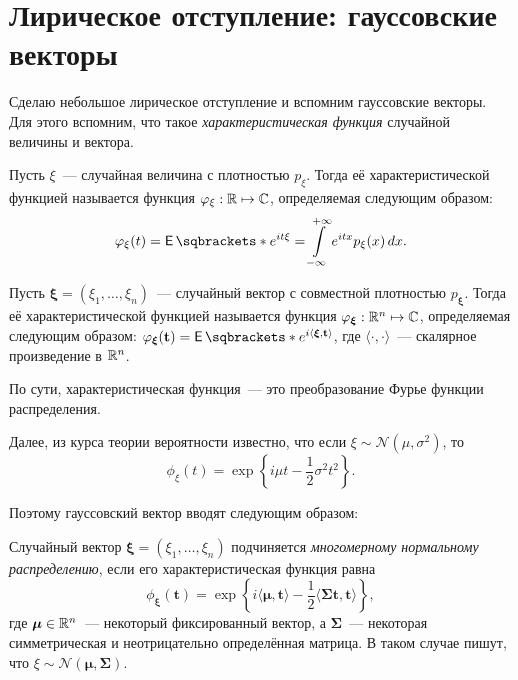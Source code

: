 \section{Лирическое отступление: гауссовские векторы}
Сделаю небольшое лирическое отступление и вспомним гауссовские векторы. Для 
этого вспомним, что такое \emph{характеристическая функция} случайной величины 
и вектора.
\begin{definition}
	Пусть \(\xi\)~--- случайная величина с плотностью \(p_{\xi}\). Тогда её 
	характеристической функцией называется функция \(\varphi_{\xi} : \mathbb{R} \mapsto 
	\mathbb{C}\), определяемая следующим образом:
	\[
	\phi_{\xi}(t) = \E{e^{it\xi}} = \int\limits_{-\infty}^{+\infty} 
	e^{itx}p_{\xi}(x)\diff x.
	\]
\end{definition}
\begin{definition}
	Пусть \(\bm{\xi} = (\xi_{1}, \dots, \xi_{n})\)~--- случайный вектор с 
	совместной плотностью \(p_{\bm{\xi}}\). Тогда её характеристической 
	функцией называется функция \(\varphi_{\bm{\xi}} : \mathbb{R}^{n} \mapsto \mathbb{C}\), 
	определяемая следующим образом: \(\phi_{\bm{\xi}}(\mathbf{t}) = 
	\E{e^{i\langle\bm{\xi}, \mathbf{t}\rangle}}\), где \(\langle\cdot, 
	\cdot\rangle\)~--- скалярное произведение в \(\mathbb{R}^{n}\).
\end{definition}

По сути, характеристическая функция~--- это преобразование Фурье функции 
распределения.

Далее, из курса теории вероятности известно, что если \(\xi \sim 
\mathcal{N}(\mu, \sigma^{2})\), то
\[
\phi_{\xi}(t) = \exp\left\{i \mu t - \frac{1}{2}\sigma^{2}t^{2}\right\}.
\]

Поэтому гауссовский вектор вводят следующим образом:
\begin{definition}
	Случайный вектор \(\bm{\xi} = (\xi_{1}, \dots, \xi_{n})\) подчиняется 
	\emph{многомерному нормальному распределению}, если его характеристическая 
	функция равна
	\[
	\phi_{\bm{\xi}}(\mathbf{t}) = \exp\left\{i\langle\bm{\mu}, 
	\mathbf{t}\rangle - \frac{1}{2}\langle\mathbf{\Sigma t}, 
	\mathbf{t}\rangle\right\},
	\]
	где \(\bm{\mu} \in \mathbb{R}^{n}\)~--- некоторый фиксированный вектор, а 
	\(\mathbf{\Sigma}\)~--- некоторая симметрическая и неотрицательно 
	определённая матрица. В таком случае пишут, что \(\xi \sim 
	\mathcal{N}(\bm{\mu}, \mathbf{\Sigma})\).
\end{definition}

